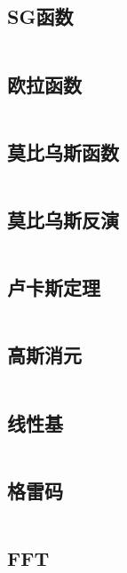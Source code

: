 \documentclass[a4paper]{article}
\newcommand{\cppcode}[1]{
    \inputminted[mathescape]{cpp}{#1}
}
\begin{document}
\cppcode{math/segment-sieve.cpp}

\subsection{SG函数}

\cppcode{math/SG-function.cpp}

\subsection{欧拉函数}

\cppcode{math/euler-function.cpp}

\subsection{莫比乌斯函数}

\cppcode{math/mobius-function.cpp}

\subsection{莫比乌斯反演}

\cppcode{math/mobius-inversion.cpp}

\subsection{卢卡斯定理}

\cppcode{math/Lucas.cpp}

\subsection{高斯消元}

\cppcode{math/Gaussian-Elimination.cpp}

\subsection{线性基}

\cppcode{math/LinearBasis.cpp}

\subsection{格雷码}

\cppcode{math/gray-code.cpp}

\subsection{FFT}
\end{document}
